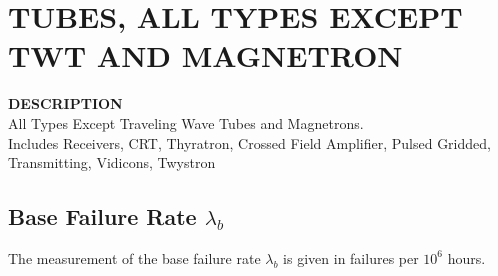 \section{TUBES, ALL TYPES EXCEPT TWT AND MAGNETRON}
\textbf{DESCRIPTION}\\
{\fontsize{12pt}{12pt}\selectfont All Types Except Traveling Wave Tubes and Magnetrons.\\
Includes Receivers, CRT, Thyratron, Crossed Field Amplifier, Pulsed Gridded, Transmitting,
Vidicons, Twystron}


\subsection{Base Failure Rate $\lambda_b$}
The measurement of the base failure rate $\lambda_b$ is given in failures per $10^6$ hours.

